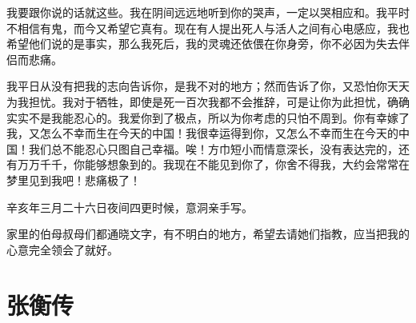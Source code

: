\documentclass[12pt,UTF-8,openany,a4]{ctexbook}
\begin{document}
\begin{large}
    我要跟你说的话就这些。我在阴间远远地听到你的哭声，一定以哭相应和。我平时不相信有鬼，而今又希望它真有。现在有人提出死人与活人之间有心电感应，我也希望他们说的是事实，那么我死后，我的灵魂还依偎在你身旁，你不必因为失去伴侣而悲痛。
    
    我平日从没有把我的志向告诉你，是我不对的地方；然而告诉了你，又恐怕你天天为我担忧。我对于牺牲，即使是死一百次我都不会推辞，可是让你为此担忧，确确实实不是我能忍心的。我爱你到了极点，所以为你考虑的只怕不周到。你有幸嫁了我，又怎么不幸而生在今天的中国！我很幸运得到你，又怎么不幸而生在今天的中国！我们总不能忍心只图自己幸福。唉！方巾短小而情意深长，没有表达完的，还有万万千千，你能够想象到的。我现在不能见到你了，你舍不得我，大约会常常在梦里见到我吧！悲痛极了！
    
    辛亥年三月二十六日夜间四更时候，意洞亲手写。
    
    家里的伯母叔母们都通晓文字，有不明白的地方，希望去请她们指教，应当把我的心意完全领会了就好。
    

\end{large}



\chapter{张衡传}
\end{document}
